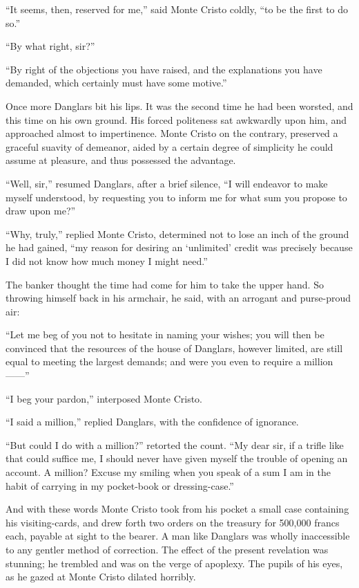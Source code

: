 “It seems, then, reserved for me,” said Monte Cristo coldly, “to be the
first to do so.”

“By what right, sir?”

“By right of the objections you have raised, and the explanations you
have demanded, which certainly must have some motive.”

Once more Danglars bit his lips. It was the second time he had been
worsted, and this time on his own ground. His forced politeness sat
awkwardly upon him, and approached almost to impertinence. Monte Cristo
on the contrary, preserved a graceful suavity of demeanor, aided by a
certain degree of simplicity he could assume at pleasure, and thus
possessed the advantage.

“Well, sir,” resumed Danglars, after a brief silence, “I will endeavor
to make myself understood, by requesting you to inform me for what sum
you propose to draw upon me?”

“Why, truly,” replied Monte Cristo, determined not to lose an inch of
the ground he had gained, “my reason for desiring an ‘unlimited’ credit
was precisely because I did not know how much money I might need.”

The banker thought the time had come for him to take the upper hand. So
throwing himself back in his armchair, he said, with an arrogant and
purse-proud air:

“Let me beg of you not to hesitate in naming your wishes; you will then
be convinced that the resources of the house of Danglars, however
limited, are still equal to meeting the largest demands; and were you
even to require a million——”

“I beg your pardon,” interposed Monte Cristo.

“I said a million,” replied Danglars, with the confidence of ignorance.

“But could I do with a million?” retorted the count. “My dear sir, if a
trifle like that could suffice me, I should never have given myself the
trouble of opening an account. A million? Excuse my smiling when you
speak of a sum I am in the habit of carrying in my pocket-book or
dressing-case.”

And with these words Monte Cristo took from his pocket a small case
containing his visiting-cards, and drew forth two orders on the
treasury for 500,000 francs each, payable at sight to the bearer. A man
like Danglars was wholly inaccessible to any gentler method of
correction. The effect of the present revelation was stunning; he
trembled and was on the verge of apoplexy. The pupils of his eyes, as
he gazed at Monte Cristo dilated horribly.

